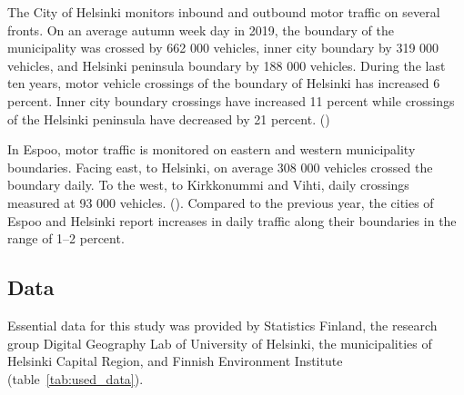 The City of Helsinki monitors inbound and outbound motor traffic on several fronts. On an average autumn week day in 2019, the boundary of the municipality was crossed by 662 000 vehicles, inner city boundary by 319 000 vehicles, and Helsinki peninsula boundary by 188 000 vehicles. During the last ten years, motor vehicle crossings of the boundary of Helsinki has increased 6 percent. Inner city boundary crossings have increased 11 percent while crossings of the Helsinki peninsula have decreased by 21 percent. (\cite{CityofHelsinki2019})

In Espoo, motor traffic is monitored on eastern and western municipality boundaries. Facing east, to Helsinki, on average 308 000 vehicles crossed the boundary daily. To the west, to Kirkkonummi and Vihti, daily crossings measured at 93 000 vehicles. (\cite{Espoonkaup2020}). Compared to the previous year, the cities of Espoo and Helsinki report increases in daily traffic along their boundaries in the range of 1--2 percent.

\subsection{Data}
\justify

Essential data for this study was provided by Statistics Finland, the research group Digital Geography Lab of University of Helsinki, the municipalities of Helsinki Capital Region, and Finnish Environment Institute (table~\ref{tab:used_data}).

